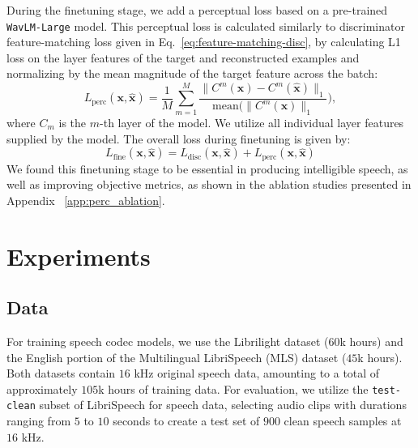 \documentclass{article} %
\begin{document}
During the finetuning stage, we add a perceptual loss based on a pre-trained \texttt{WavLM-Large}\citep{Chen_2022} model. This perceptual loss is calculated similarly to discriminator feature-matching loss given in Eq.~\ref{eq:feature-matching-disc}, by calculating L1 loss on the layer features of the target and reconstructed examples and normalizing by the mean magnitude of the target feature across the batch:
\begin{equation}
\label{eq:feature-matching-perc}
\textit{L}_\text{perc}(\mathbf{x}, \hat{\mathbf{x}}) = \frac{1}{M}\sum_{m = 1}^M \frac{\lVert C^m(\mathbf{x}) - C^m (\hat{\mathbf{x}})\rVert_1}{\text{mean}(\lVert C^m(\mathbf{x})\rVert_1}),
\end{equation}
where $C_m$ is the $m$-th layer of the model. We utilize all individual layer features supplied by the model.
The overall loss during finetuning is given by:
\begin{equation}
\textit{L}_\text{fine}(\mathbf{x}, \hat{\mathbf{x}}) = \textit{L}_\text{disc}(\mathbf{x}, \hat{\mathbf{x}}) + \textit{L}_\text{perc}(\mathbf{x}, \hat{\mathbf{x}})
\end{equation}
We found this finetuning stage to be essential in producing intelligible speech, as well as improving objective metrics, as shown in the ablation studies presented in Appendix ~\ref{app:perc_ablation}.

\section{Experiments}

\subsection{Data}
For training speech codec models, we use the Librilight dataset ($60$k hours) and the English portion of the Multilingual LibriSpeech (MLS) dataset ($45$k hours). Both datasets contain $16$ kHz original speech data, amounting to a total of approximately $105$k hours of training data. For evaluation, we utilize the \texttt{test-clean} subset of LibriSpeech for speech data, selecting audio clips with durations ranging from $5$ to $10$ seconds to create a test set of $900$ clean speech samples at $16$ kHz. 
\end{document}

